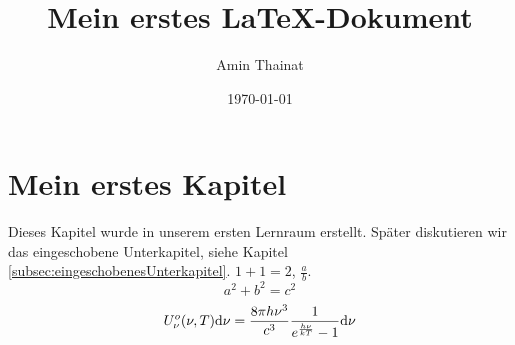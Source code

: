 \documentclass{article}
\title{Mein erstes \LaTeX-Dokument}
\author{Amin Thainat}
\date{\today}
\begin{document}
	\maketitle
	\tableofcontents
\section{Mein erstes Kapitel}
Dieses Kapitel wurde in unserem ersten Lernraum erstellt. 
Später diskutieren wir das eingeschobene Unterkapitel, siehe Kapitel \ref{subsec:eingeschobenesUnterkapitel}.
$1+1=2$, $\frac{a}{b}$.
\begin{equation}
a^2+b^2=c^2
\end{equation}
\begin{equation}
	U_{\nu}^{o}(\nu,T)\text{d}\nu
	=
	\frac{8\pi h\nu^3}{c^3}
	\frac{1}{e^{\frac{h\nu}{kT}}-1}\text{d}\nu\label{eq:Strahlungsgesetz}
\end{equation}
\end{document}

